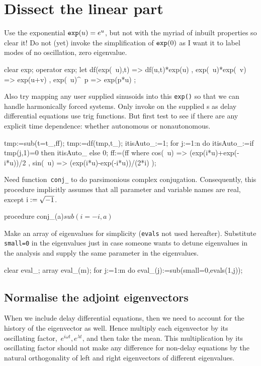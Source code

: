 \documentclass[11pt,a5paper]{article}
\begin{document}
\section{Dissect the linear part}
\localtableofcontents


Use the exponential $\verb|exp|(u)=e^{u}$, but not with the
myriad of inbuilt properties so clear it! Do not (yet)
invoke the simplification of $\verb|exp|(0)$ as I want it to
label modes of no oscillation, zero eigenvalue.
\begin{reduce}
clear exp; operator exp;
let { df(exp(~u),t) => df(u,t)*exp(u)
    , exp(~u)*exp(~v) => exp(u+v)
    , exp(~u)^~p => exp(p*u)
    };
\end{reduce}
Also try mapping any user supplied sinusoids into 
this \verb|exp()| so that we can handle harmonically 
forced systems.  Only invoke on the supplied \ode{}s as 
delay differential equations use trig functions.
But first test to see if there are any explicit time
dependence: whether autonomous or nonautonomous.
\begin{reduce}
tmp:=sub(t=t_,ff);  tmp:=df(tmp,t_);
itisAuto_:=1;
for j:=1:n do itisAuto_:=if tmp(j,1)=0 then itisAuto_ else 0;
ff:=(ff where { cos(~u) => (exp(i*u)+exp(-i*u))/2
              , sin(~u) => (exp(i*u)-exp(-i*u))/(2*i) 
              } );
\end{reduce}


Need function~\verb|conj_| to do parsimonious complex
conjugation.   Consequently, this procedure implicitly
assumes that all parameter and variable names are real,
except \(\mbox{i}:=\sqrt{-1}\).
\begin{reduce}
procedure conj_(a)$ sub(i=-i,a)$
\end{reduce}

Make an array of eigenvalues for simplicity (\verb|evals|
not used hereafter).  Substitute \verb|small=0| in the
eigenvalues just in case someone wants to detune eigenvalues
in the analysis and supply the same parameter in the
eigenvalues.
\begin{reduce}
clear eval_;  array eval_(m);
for j:=1:m do eval_(j):=sub(small=0,evals(1,j));
\end{reduce}



\subsection{Normalise the adjoint eigenvectors}
When we include delay differential equations, then we need
to account for the history of the eigenvector as well. Hence
multiply each eigenvector by its oscillating
factor,~\(e^{i\omega t}, e^{\lambda t}\), and then take the
mean. This multiplication by its oscillating factor should
not make any difference for non-delay equations by the
natural orthogonality of left and right eigenvectors of
different eigenvalues. 
\end{document}
